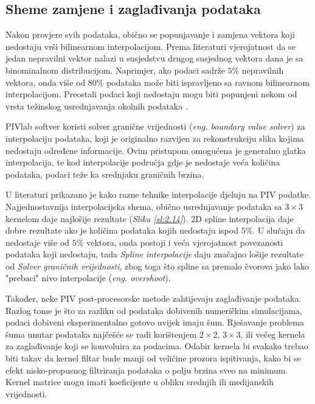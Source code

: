 \subsection{Sheme zamjene i zaglađivanja podataka}
Nakon provjere svih podataka, obično se popunjavanje i zamjena vektora koji nedostaju vrši bilinearnom interpolacijom. Prema literaturi \cite{westerweel1994efficient} vjerojatnost da se jedan nepravilni vektor nalazi u susjedstvu drugog susjednog vektora dana je sa binominalnom distribucijom. Naprimjer, ako podaci sadrže $5\%$ nepravilnih vektora, onda više od $80\%$ podataka može biti ispravljeno sa ravnom bilinearnom interpolacijom. Preostali podaci koji nedostaju mogu biti popunjeni nekom od vrsta težinskog usrednjavanja okolnih podataka \cite{raffel2018_book}.
\par
PIVlab softver koristi solver granične vrijednosti (\textit{eng. boundary value solver}) za interpolaciju podataka, koji je originalno razvijen za rekonstrukciju slika kojima nedostaju određene informacije. Ovim pristupom omogućena je generalno glatka interpolacija, te kod interpolacije područja gdje je nedostaje veća količina podataka, podaci teže ka srednjaku graničnih brzina.
\par
U literaturi \cite{thielicke2014_phd} prikazano je kako razne tehnike interpolacije djeluju na PIV podatke. Najjednostavnija interpolacijska shema, obično usrednjavanje podataka sa $3 \times 3$ kernelom daje najlošije rezultate (\textit{Slika \ref{sl:2.14}}). 2D spline interpolacija daje dobre rezultate ako je količina podataka kojih nedostaju ispod $5\%$. U slučaju da nedostaje više od $5\%$ vektora, onda postoji i veća vjerojatnost povezanosti podataka koji nedostaju, tada \textit{Spline interpolacije} daju značajno lošije rezultate od \textit{Solver graničnih vrijednosti}, zbog toga što spline sa premalo čvorova jako lako "prebaci" nivo interpolacije (\textit{eng. overshoot}).
\par
Također, neke PIV post-procesorske metode zahtijevaju zaglađivanje podataka. Razlog tome je što za razliku od podataka dobivenih numeričkim simulacijama, podaci dobiveni eksperimentalno gotovo uvijek imaju šum. Rješavanje problema šuma unutar podataka najčešće se radi korištenjem $2 \times 2$, $3 \times 3$, ili većeg kernela za zaglađivanje koji se konvoluira za podacima. Odabir kernela bi svakako trebao biti takav da kernel filtar bude manji od veličine prozora ispitivanja, kako bi se efekt nisko-propusnog filtriranja podataka o polju brzina sveo na minimum. Kernel matrice mogu imati koeficijente u obliku srednjih ili medijanskih vrijednosti.

